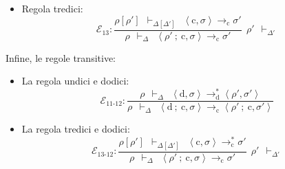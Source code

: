 \documentclass[a4paper]{article}
\begin{document}
\begin{itemize}
\begin{itemize}
 			\item Regola tredici:
 			\begin{equation*}
 				\mathcal{E}_{13} : \dfrac{
 					\rho\left[\rho'\right] \:\: \vdash_{\Delta\left[\Delta'\right]} \:\: \left\langle \mathrm{c}, \sigma \right\rangle \rightarrow_{\mathrm{c}} \sigma'
 				}{
 					\rho \:\: \vdash_{\Delta} \:\: \left\langle \rho' \: \mathbf{;} \: \mathrm{c}, \sigma \right\rangle \rightarrow_{\mathrm{c}} \sigma'
 				} \:\: \rho' \:\: \vdash_{\Delta'}
 			\end{equation*}
 		\end{itemize}
 	\end{itemize}\newpage
 	
 	\noindent
 	Infine, le regole transitive:
 	\begin{itemize}
 		\item La regola undici e dodici:
 		\begin{equation*}
 			\mathcal{E}_{11\text{-}12} : \dfrac{
 				\rho \:\: \vdash_{\Delta} \:\: \left\langle \mathrm{d}, \sigma \right\rangle \rightarrow^{*}_{\mathrm{d}} \left\langle \rho', \sigma' \right\rangle
 			}{
 				\rho \:\: \vdash_{\Delta} \:\: \left\langle \mathrm{d} \: \boldsymbol{;} \: \mathrm{c}, \sigma \right\rangle \rightarrow_{\mathrm{c}} \left\langle \rho' \: \boldsymbol{;} \: \mathrm{c}, \sigma' \right\rangle
 			}
 		\end{equation*}
 		
 		\item La regola tredici e dodici:
 		\begin{equation*}
 			\mathcal{E}_{13\text{-}12} : \dfrac{
 				\rho\left[\rho'\right] \:\: \vdash_{\Delta\left[\Delta'\right]} \:\: \left\langle \mathrm{c}, \sigma \right\rangle \rightarrow_{\mathrm{c}}^{*} \sigma'
 			}{
 				\rho \:\: \vdash_{\Delta} \:\: \left\langle \rho' \: \boldsymbol{;} \: \mathrm{c}, \sigma \right\rangle \rightarrow_{\mathrm{c}} \sigma'
 			} \:\: \rho' \:\: \vdash_{\Delta'}
 		\end{equation*}
 	\end{itemize}\:\newline
 	
\end{document}
